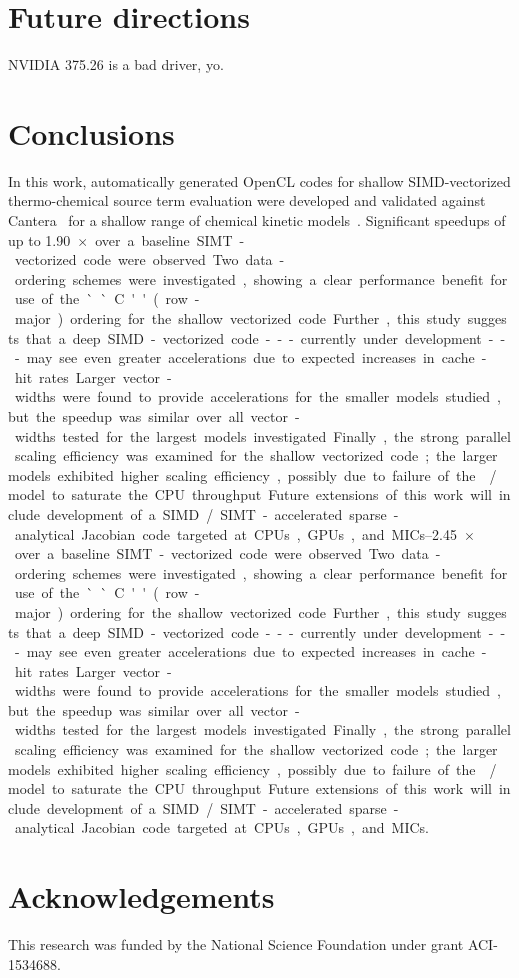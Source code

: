 \documentclass[12pt,number,sort&compress,preprint]{elsarticle}
\begin{document}
\section{Future directions}
\label{s:future}
NVIDIA 375.26 is a bad driver, yo.

\section{Conclusions}
In this work, automatically generated OpenCL codes for shallow SIMD-vectorized thermo-chemical source term evaluation were developed and validated against Cantera~\cite{Cantera} for a shallow range of chemical kinetic models~\cite{Burke:2011fh,smith_gri-mech_30,Wang:2007,Sarathy:2013jr}.
Significant speedups of up to \SIrange{1.90}{2.45}{$\times$} over a baseline SIMT-vectorized code were observed.
Two data-ordering schemes were investigated, showing a clear performance benefit for use of the ``C'' (row-major) ordering for the shallow vectorized code.
Further, this study suggests that a deep SIMD-vectorized code---currently under development---may see even greater accelerations due to expected increases in cache-hit rates.
Larger vector-widths were found to provide accelerations for the smaller models studied, but the speedup was similar over all vector-widths tested for the largest models investigated.
Finally, the strong parallel scaling efficiency was examined for the shallow vectorized code; the larger models exhibited higher scaling efficiency, possibly due to failure of the \slash{} model to saturate the CPU throughput.
Future extensions of this work will include development of a SIMD\slash SIMT-accelerated sparse-analytical Jacobian code targeted at CPUs, GPUs, and MICs.

\section{Acknowledgements}
This research was funded by the National Science Foundation under grant ACI-1534688.


\end{document}

